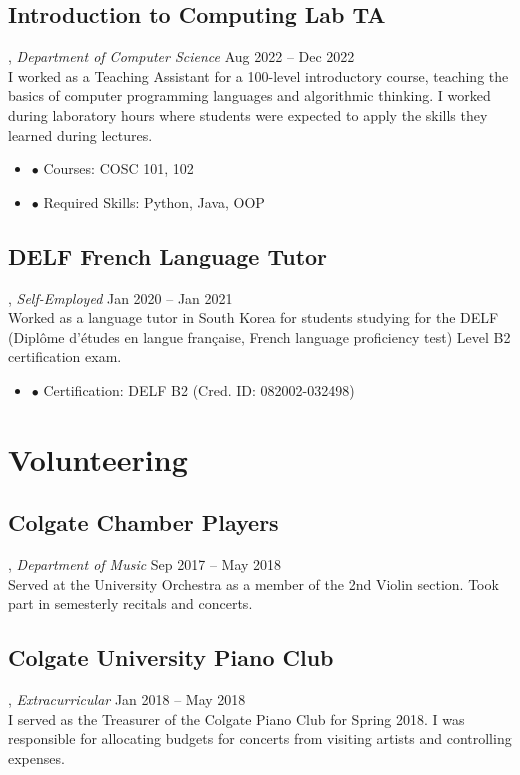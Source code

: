 \documentclass[10pt, letterpaper]{article}
\newenvironment{nitemize}{%
  \begin{itemize}[label={},topsep=0pt,itemsep=0pt,parsep=0pt,leftmargin=*]%
}{%
  \end{itemize}%
}
\begin{document}
\subsection{Introduction to Computing Lab TA}, \emph{Department of Computer Science} \hfill Aug 2022 – Dec 2022\\
I worked as a Teaching Assistant for a 100-level introductory course, teaching the basics of computer programming languages and algorithmic thinking. I worked during laboratory hours where students were expected to apply the skills they learned during lectures.
\begin{nitemize}
    \item \(\bullet\) Courses: COSC 101, 102
    \item \(\bullet\) Required Skills: Python, Java, OOP
\end{nitemize}

\subsection{DELF French Language Tutor}, \emph{Self-Employed} \hfill Jan 2020 – Jan 2021\\
Worked as a language tutor in South Korea for students studying for the DELF (Diplôme d’études en langue française, French language proficiency test) Level B2 certification exam.
\begin{nitemize}
    \item \(\bullet\) Certification: DELF B2 (Cred. ID: 082002-032498)
\end{nitemize}

\section{Volunteering}
\subsection{Colgate Chamber Players}, \emph{Department of Music} \hfill Sep 2017 – May 2018\\
\noindent Served at the University Orchestra as a member of the 2nd Violin section. Took part in semesterly recitals and concerts.

\subsection{Colgate University Piano Club}, \emph{Extracurricular} \hfill Jan 2018 – May 2018\\
I served as the Treasurer of the Colgate Piano Club for Spring 2018. I was responsible for allocating budgets for concerts from visiting artists and controlling expenses.
\end{document}
